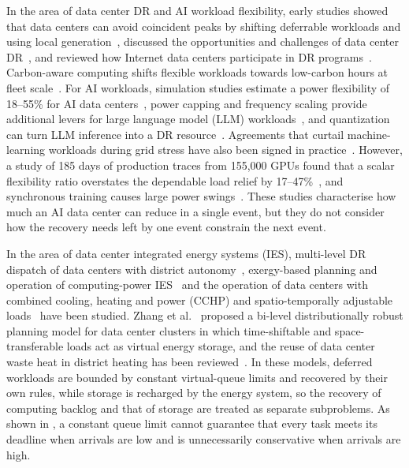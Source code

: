 In the area of data center DR and AI workload flexibility, early studies showed that data centers can avoid coincident
peaks by shifting deferrable workloads and using local generation~\cite{liu2013}, discussed the opportunities and
challenges of data center DR~\cite{wierman2014}, and reviewed how Internet data centers participate in DR
programs~\cite{chen2020review}. Carbon-aware computing shifts flexible workloads towards low-carbon hours at fleet
scale~\cite{radovanovic2023}. For AI workloads, simulation studies estimate a power flexibility of 18--55\% for AI data
centers~\cite{acun2026}, power capping and frequency scaling provide additional levers for large language model (LLM)
workloads~\cite{patel2024}, and quantization can turn LLM inference into a DR resource~\cite{du2026}. Agreements that
curtail machine-learning workloads during grid stress have also been signed in practice~\cite{google2025}. However, a
study of 185 days of production traces from 155,000 GPUs found that a scalar flexibility ratio overstates the dependable
load relief by 17--47\%~\cite{li2026scalar}, and synchronous training causes large power swings~\cite{choukse2025}.
These studies characterise how much an AI data center can reduce in a single event, but they do not consider how the
recovery needs left by one event constrain the next event.

In the area of data center integrated energy systems (IES), multi-level DR dispatch of data centers with district
autonomy~\cite{han2024}, exergy-based planning and operation of computing-power IES~\cite{lin2025} and the operation
of data centers with combined cooling, heating and power (CCHP) and spatio-temporally adjustable loads~\cite{fan2026}
have been studied. Zhang et al.~\cite{zhang2026bilevel} proposed a bi-level distributionally robust planning model for
data center clusters in which time-shiftable and space-transferable loads act as virtual energy storage, and the reuse of
data center waste heat in district heating has been reviewed~\cite{huang2020,wahlroos2018}. In these models, deferred
workloads are bounded by constant virtual-queue limits and recovered by their own rules, while storage is recharged by
the energy system, so the recovery of computing backlog and that of storage are treated as separate subproblems. As
shown in , a constant queue limit cannot guarantee that every task meets its deadline when
arrivals are low and is unnecessarily conservative when arrivals are high.

